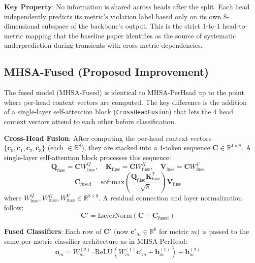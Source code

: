 \textbf{Key Property}: No information is shared across heads after the split. Each head independently predicts its metric's violation label based only on its own 8-dimensional subspace of the backbone's output. This is the strict 1-to-1 head-to-metric mapping that the baseline paper identifies as the source of systematic underprediction during transients with cross-metric dependencies.

\subsection{MHSA-Fused (Proposed Improvement)}
\label{subsec:fused}

The fused model (MHSA-Fused) is identical to MHSA-PerHead up to the point where per-head context vectors are computed. The key difference is the addition of a single-layer self-attention block (\texttt{CrossHeadFusion}) that lets the 4 head context vectors attend to each other before classification.

\textbf{Cross-Head Fusion}: After computing the per-head context vectors $\{\mathbf{c}_0, \mathbf{c}_1, \mathbf{c}_2, \mathbf{c}_3\}$ (each $\in \mathbb{R}^8$), they are stacked into a 4-token sequence $\mathbf{C} \in \mathbb{R}^{4 \times 8}$. A single-layer self-attention block processes this sequence:
\begin{equation}
\mathbf{Q}_{\text{fuse}} = \mathbf{C} W_{\text{fuse}}^Q, \quad \mathbf{K}_{\text{fuse}} = \mathbf{C} W_{\text{fuse}}^K, \quad \mathbf{V}_{\text{fuse}} = \mathbf{C} W_{\text{fuse}}^V
\end{equation}
\begin{equation}
\mathbf{C}_{\text{fused}} = \text{softmax}\left(\frac{\mathbf{Q}_{\text{fuse}} \mathbf{K}_{\text{fuse}}^T}{\sqrt{8}}\right) \mathbf{V}_{\text{fuse}}
\end{equation}
where $W_{\text{fuse}}^Q, W_{\text{fuse}}^K, W_{\text{fuse}}^V \in \mathbb{R}^{8 \times 8}$. A residual connection and layer normalization follow:
\begin{equation}
\mathbf{C}' = \text{LayerNorm}(\mathbf{C} + \mathbf{C}_{\text{fused}})
\end{equation}

\textbf{Fused Classifiers}: Each row of $\mathbf{C}'$ (now $\mathbf{c}'_m \in \mathbb{R}^8$ for metric $m$) is passed to the same per-metric classifier architecture as in MHSA-PerHead:
\begin{equation}
\mathbf{o}_m = W_m^{(2)} \cdot \text{ReLU}(W_m^{(1)} \mathbf{c}'_m + \mathbf{b}_m^{(1)}) + \mathbf{b}_m^{(2)}
\end{equation}

